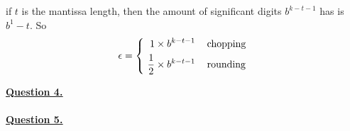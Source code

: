 \documentclass[12pt]{article}
\begin{document}
if $t$ is the mantissa length, then the amount of significant digits $b^{k-t-1}$ has is $b^1-t$. So $$
\epsilon = \left\{
	\begin{aligned}
		\ 1 \times b^{k-t-1}           & \hspace*{3mm}\text{ chopping } \\
		\ \frac{1}{2} \times b^{k-t-1} & \hspace*{3mm}\text{ rounding } \\
	\end{aligned}
\right.
$$

\newpage
\noindent \hyperlink{toc}{\hypertarget{4}{\LARGE \underline{\textbf{Question 4.}}}}\\\\
\newpage
\noindent \hyperlink{toc}{\hypertarget{5}{\LARGE \underline{\textbf{Question 5.}}}}\\\\
\end{document}
